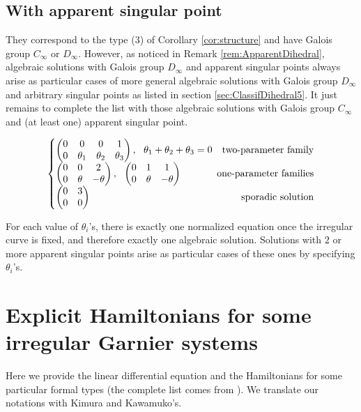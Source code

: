 \documentclass[12]{amsart}
\begin{document}
\subsection{With apparent singular point}
They correspond to the type (3) of Corollary \ref{cor:structure} and have Galois group $C_\infty$ or $D_\infty$.
However, as noticed in Remark \ref{rem:ApparentDihedral}, algebraic solutions with Galois group $D_\infty$
and apparent singular points always arise as particular cases of more general algebraic solutions with Galois group $D_\infty$
and arbitrary singular points as listed in section \ref{sec:ClassifDihedral5}. It just remains to complete the list
with those algebraic solutions with Galois group $C_\infty$ and (at least one) apparent singular point.

\begin{equation}
\left\{\begin{matrix}
\begin{pmatrix}0&0&0&1\\ 0&\theta_1&\theta_2&\theta_3\end{pmatrix},\ \ \theta_1+\theta_2+\theta_3=0\ \ \ 
\text{two-parameter family}\\
\begin{pmatrix}0&0&2\\ 0&\theta&-\theta\end{pmatrix},\ \ 
\begin{pmatrix}0&1&1\\ 0&\theta&-\theta\end{pmatrix}\hfill\hfill
\text{one-parameter families}\\
\begin{pmatrix}0&3\\ 0&0\end{pmatrix}\hfill\hfill
\text{sporadic solution}
\end{matrix}\right.
\end{equation}

For each value of $\theta_i$'s, there is exactly one normalized equation once the irregular curve is fixed,
and therefore exactly one algebraic solution.
Solutions with $2$ or more apparent singular points arise as particular cases of these ones by specifying $\theta_i$'s.





\section{Explicit Hamiltonians for some irregular Garnier systems}\label{sec:GarnierHamiltonians}
Here we provide the linear differential equation and the Hamiltonians for some particular formal types
(the complete list comes from \cite{Kimura,Kawamuko}). We translate our notations with Kimura and Kawamuko's.
\end{document}

